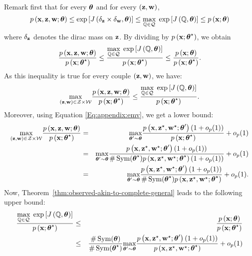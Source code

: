 Remark first that for every $\boldsymbol{\theta}$ and for every $\left(\mathbf{z},\mathbf{w}\right)$, 
\[p\left(\mathbf{x},\mathbf{z},\mathbf{w};\boldsymbol{\theta}\right)\leq\exp\left[J\left(\delta_{\mathbf{z}}\times\delta_{\mathbf{w}},\boldsymbol{\theta}\right)\right]
\leq \underset{\mathbb{Q}\in\mathcal{Q}}{\max}\;\exp\left[J\left(\mathbb{Q},\boldsymbol{\theta}\right)\right]\leq p\left(\mathbf{x};\boldsymbol{\theta}\right)\]
where $\delta_{\mathbf{z}}$ denotes the dirac mass on $\mathbf{z}$. By dividing by $p\left(\mathbf{x};\boldsymbol{\theta}^\star\right)$, we obtain
\[\frac{p\left(\mathbf{x},\mathbf{z},\mathbf{w};\boldsymbol{\theta}\right)}{p\left(\mathbf{x};\boldsymbol{\theta}^\star\right)}
\leq \frac{\underset{\mathbb{Q}\in\mathcal{Q}}{\max}\;\exp\left[J\left(\mathbb{Q},\boldsymbol{\theta}\right)\right]}{p\left(\mathbf{x};\boldsymbol{\theta}^\star\right)} \leq\frac{p\left(\mathbf{x};\boldsymbol{\theta}\right)}{p\left(\mathbf{x};\boldsymbol{\theta}^\star\right)}.\]
As this inequality is true for every couple $(\mathbf{z},\mathbf{w})$, we have:
\[\underset{(\mathbf{z},\mathbf{w})\in\mathcal{Z}\times\mathcal{W}}{\max}\frac{p\left(\mathbf{x},\mathbf{z},\mathbf{w};\boldsymbol{\theta}\right)}{p\left(\mathbf{x};\boldsymbol{\theta}^\star\right)}
\leq \frac{\underset{\mathbb{Q}\in\mathcal{Q}}{\max}\;\exp\left[J\left(\mathbb{Q},\boldsymbol{\theta}\right)\right]}{p\left(\mathbf{x};\boldsymbol{\theta}^\star\right)} .\]
Moreover, using Equation \ref{Eq:appendix:emv}, we get a lower bound:
\begin{eqnarray*}
\underset{(\bz,\bw)\in\mcZ\times\mcW}{\max}\frac{\prob\left(\bx,\bz,\bw;\btheta\right)}{\prob\left(\bx;\bthetas\right)}&=&\underset{\btheta'\sim\btheta}{\max}\frac{\prob\left(\bx,\bzs,\bws;\btheta'\right)\left(1+o_p(1)\right)}{\prob\left(\bx;\bthetas\right)}+o_p(1)\\
&=&\underset{\btheta'\sim\btheta}{\max}\frac{\prob\left(\bx,\bzs,\bws;\btheta'\right)\left(1+o_p(1)\right)}{\#\Symmetric(\bthetas)\prob\left(\bx,\bzs,\bws;\bthetas\right)\left(1+o_p(1)\right)}+o_p(1)\\
&=&\underset{\btheta'\sim\btheta}{\max}\frac{\prob\left(\bx,\bzs,\bws;\btheta'\right)\left(1+o_p(1)\right)}{\#\Symmetric(\bthetas)\prob\left(\bx,\bzs,\bws;\bthetas\right)}+o_p(1).\\
\end{eqnarray*}
Now, Theorem~\ref{thm:observed-akin-to-complete-general} leads to the following upper bound:
\begin{eqnarray*}
\frac{\underset{\setQ\in\mcQ}{\max}\;\exp\left[\Jvar\left(\setQ,\btheta\right)\right]}{\prob\left(\bx;\bthetas\right)} &\leq&\frac{\prob\left(\bx;\btheta\right)}{\prob\left(\bx;\bthetas\right)}\\
&\leq&\frac{\# \Symmetric(\btheta)}{\# \Symmetric(\bthetas)}\underset{\btheta'\sim\btheta}{\max}\frac{\prob\left(\bx,\bzs,\bws;\btheta'\right)\left(1+o_p(1)\right)}{\prob\left(\bx,\bzs,\bws;\bthetas\right)}+o_p(1)\\
\end{eqnarray*}
